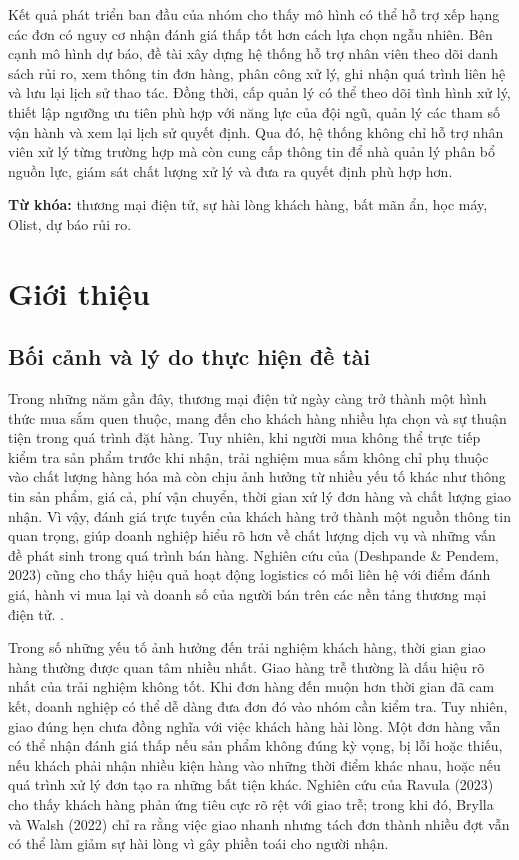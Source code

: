 \documentclass[12pt,a4paper]{report}
\begin{document}
Kết quả phát triển ban đầu của nhóm cho thấy mô hình có thể hỗ trợ xếp hạng các đơn có nguy cơ nhận đánh giá thấp tốt hơn cách lựa chọn ngẫu nhiên. Bên cạnh mô hình dự báo, đề tài xây dựng hệ thống hỗ trợ nhân viên theo dõi danh sách rủi ro, xem thông tin đơn hàng, phân công xử lý, ghi nhận quá trình liên hệ và lưu lại lịch sử thao tác. Đồng thời, cấp quản lý có thể theo dõi tình hình xử lý, thiết lập ngưỡng ưu tiên phù hợp với năng lực của đội ngũ, quản lý các tham số vận hành và xem lại lịch sử quyết định. Qua đó, hệ thống không chỉ hỗ trợ nhân viên xử lý từng trường hợp mà còn cung cấp thông tin để nhà quản lý phân bổ nguồn lực, giám sát chất lượng xử lý và đưa ra quyết định phù hợp hơn.

\par\medskip
\noindent\textbf{Từ khóa:} thương mại điện tử, sự hài lòng khách hàng, bất mãn ẩn, học máy, Olist, dự báo rủi ro.
\clearpage{}

\chapter{Giới thiệu}
\label{chap:gioi-thieu}

\section{Bối cảnh và lý do thực hiện đề tài}
\label{sec:boi-canh}

Trong những năm gần đây, thương mại điện tử ngày càng trở thành một hình thức mua sắm quen thuộc, mang đến cho khách hàng nhiều lựa chọn và sự thuận tiện trong quá trình đặt hàng. Tuy nhiên, khi người mua không thể trực tiếp kiểm tra sản phẩm trước khi nhận, trải nghiệm mua sắm không chỉ phụ thuộc vào chất lượng hàng hóa mà còn chịu ảnh hưởng từ nhiều yếu tố khác như thông tin sản phẩm, giá cả, phí vận chuyển, thời gian xử lý đơn hàng và chất lượng giao nhận. Vì vậy, đánh giá trực tuyến của khách hàng trở thành một nguồn thông tin quan trọng, giúp doanh nghiệp hiểu rõ hơn về chất lượng dịch vụ và những vấn đề phát sinh trong quá trình bán hàng. Nghiên cứu của (Deshpande \& Pendem, 2023) cũng cho thấy hiệu quả hoạt động logistics có mối liên hệ với điểm đánh giá, hành vi mua lại và doanh số của người bán trên các nền tảng thương mại điện tử. .

Trong số những yếu tố ảnh hưởng đến trải nghiệm khách hàng, thời gian giao hàng thường được quan tâm nhiều nhất. Giao hàng trễ thường là dấu hiệu rõ nhất của trải nghiệm không tốt. Khi đơn hàng đến muộn hơn thời gian đã cam kết, doanh nghiệp có thể dễ dàng đưa đơn đó vào nhóm cần kiểm tra. Tuy nhiên, giao đúng hẹn chưa đồng nghĩa với việc khách hàng hài lòng. Một đơn hàng vẫn có thể nhận đánh giá thấp nếu sản phẩm không đúng kỳ vọng, bị lỗi hoặc thiếu, nếu khách phải nhận nhiều kiện hàng vào những thời điểm khác nhau, hoặc nếu quá trình xử lý đơn tạo ra những bất tiện khác. Nghiên cứu của Ravula (2023) cho thấy khách hàng phản ứng tiêu cực rõ rệt với giao trễ; trong khi đó, Brylla và Walsh (2022) chỉ ra rằng việc giao nhanh nhưng tách đơn thành nhiều đợt vẫn có thể làm giảm sự hài lòng vì gây phiền toái cho người nhận.
\end{document}
